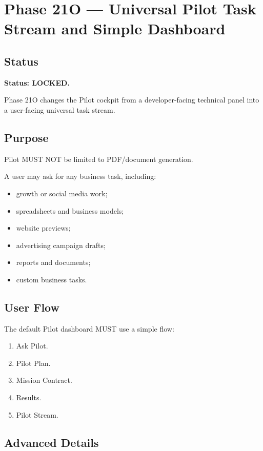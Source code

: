 \section{Phase 21O --- Universal Pilot Task Stream and Simple Dashboard}
\label{sec:aion-phase21o-universal-pilot-task-stream}

\subsection{Status}

\textbf{Status: LOCKED.}

Phase 21O changes the Pilot cockpit from a developer-facing technical panel into a user-facing universal task stream.

\subsection{Purpose}

Pilot MUST NOT be limited to PDF/document generation.

A user may ask for any business task, including:

\begin{itemize}
  \item growth or social media work;
  \item spreadsheets and business models;
  \item website previews;
  \item advertising campaign drafts;
  \item reports and documents;
  \item custom business tasks.
\end{itemize}

\subsection{User Flow}

The default Pilot dashboard MUST use a simple flow:

\begin{enumerate}
  \item Ask Pilot.
  \item Pilot Plan.
  \item Mission Contract.
  \item Results.
  \item Pilot Stream.
\end{enumerate}

\subsection{Advanced Details}

